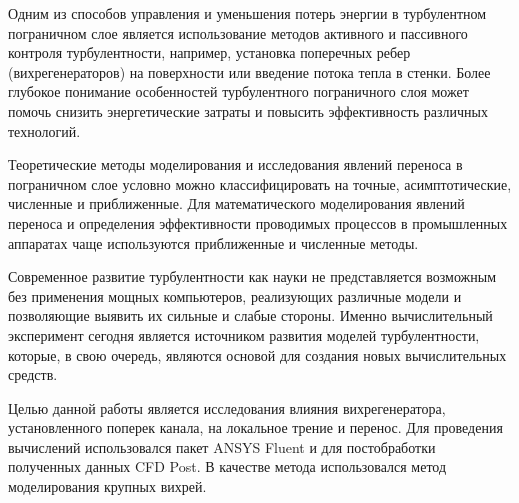 	Одним из способов управления и уменьшения потерь энергии в турбулентном пограничном слое является использование методов активного и пассивного контроля турбулентности, например, установка поперечных ребер (вихрегенераторов) на поверхности или введение потока тепла в стенки. Более глубокое понимание особенностей турбулентного пограничного слоя может помочь снизить энергетические затраты и повысить эффективность различных технологий.
	
	Теоретические методы моделирования и исследования явлений переноса в пограничном слое условно можно классифицировать на точные, асимптотические, численные и приближенные. Для математического моделирования явлений переноса и определения эффективности проводимых процессов в промышленных аппаратах чаще используются приближенные и численные методы.
	
	Современное развитие турбулентности как науки не представляется возможным без применения мощных компьютеров, реализующих различные модели и позволяющие выявить их сильные и слабые стороны. Именно вычислительный эксперимент сегодня является источником развития моделей турбулентности, которые, в свою очередь, являются основой для создания новых вычислительных средств.
	
	Целью данной работы является исследования влияния вихрегенератора, установленного поперек канала, на локальное трение и перенос. Для проведения вычислений использовался пакет ANSYS Fluent и для постобработки полученных данных CFD Post. В качестве метода использовался метод моделирования крупных вихрей.
\newpage